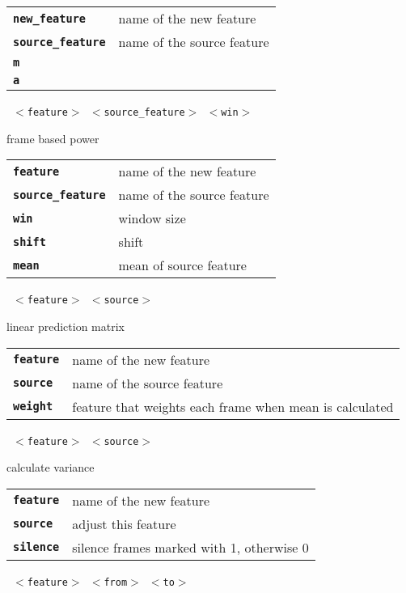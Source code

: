 \begin{description}
\begin{description}
      \begin{tabular}{ll}
 \texttt{\textbf{new\_feature}} &     name of the new feature \\
 \texttt{\textbf{source\_feature}} &  name of the source feature \\
 \texttt{\textbf{m}} &                 \\
 \texttt{\textbf{a}} &                 \\
      \end{tabular}
       \texttt{ $<$feature$>$ $<$source\_feature$>$ $<$win$>$  } \

        frame based power

      \begin{tabular}{ll}
 \texttt{\textbf{feature}} &         name of the new feature \\
 \texttt{\textbf{source\_feature}} &  name of the source feature \\
 \texttt{\textbf{win}} &             window size  \\
 \texttt{\textbf{shift}} &            shift  \\
 \texttt{\textbf{mean}} &             mean of source feature  \\
      \end{tabular}
       \texttt{ $<$feature$>$ $<$source$>$ } \

        linear prediction matrix

      \begin{tabular}{ll}
 \texttt{\textbf{feature}} &  name of the new feature \\
 \texttt{\textbf{source}} &   name of the source feature \\
 \texttt{\textbf{weight}} &    feature that weights each frame when mean is calculated \\
      \end{tabular}
       \texttt{ $<$feature$>$ $<$source$>$ } \

        calculate variance

      \begin{tabular}{ll}
 \texttt{\textbf{feature}} &  name of the new feature \\
 \texttt{\textbf{source}} &   adjust this feature \\
 \texttt{\textbf{silence}} &   silence frames marked with 1, otherwise 0 \\
      \end{tabular}
       \texttt{ $<$feature$>$ $<$from$>$ $<$to$>$ } \


\end{description}
\end{description}
